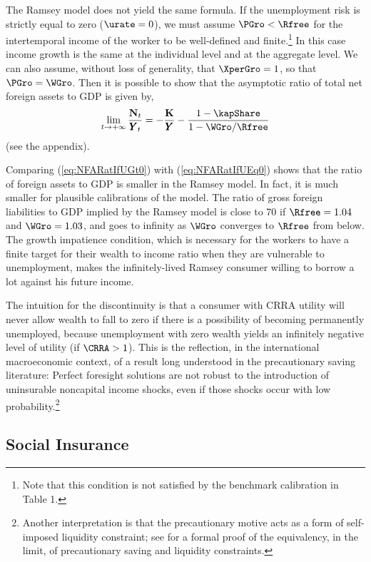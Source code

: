 \documentclass[titlepage]{\econtex}\newcommand{\texname}{cjSOE}
\renewcommand{\GDPLev}{\ensuremath{\pmb{Y}}}
\begin{document}
The Ramsey model does not yield the same formula. If the unemployment risk is strictly equal to zero ($\urate=0$), we must assume $\PGro < \Rfree$ for the intertemporal income of the worker to be well-defined and finite.\footnote{Note that this condition is not satisfied by the benchmark calibration in Table 1.} In this case income growth is the same at the individual level and at the aggregate level. We can also assume, without loss of generality, that $\XperGro=1$, so that $\PGro=\WGro$. Then it is possible to show that the asymptotic ratio of total net foreign assets to GDP is given by,
\begin{equation}
\lim_{t \rightarrow +\infty} \frac{\NFALev_t}{\GDPLev_t}=-\frac{\KLev}{\GDPLev}-\frac{1-\kapShare}{1-\WGro/\Rfree}
\label{eq:NFARatIfUEq0}
\end{equation}
(see the appendix).

Comparing (\ref{eq:NFARatIfUGt0}) with (\ref{eq:NFARatIfUEq0}) shows that the ratio of foreign assets to GDP is smaller in the Ramsey model. In fact, it is much smaller for plausible calibrations of the model. The ratio of gross foreign liabilities to GDP implied by the Ramsey model is close to 70 if $\Rfree =1.04$ and $\WGro =1.03$, and goes to infinity as $\WGro$ converges to $\Rfree$ from below. The growth impatience condition, which is necessary for the workers to have a finite target for their wealth to income ratio when they are vulnerable to unemployment, makes the infinitely-lived Ramsey consumer willing to borrow a lot against his future income.

The intuition for the discontinuity is that a consumer with CRRA
utility will never allow wealth to fall to zero if there is a
possibility of becoming permanently unemployed, because unemployment
with zero wealth yields an infinitely negative level of utility (if
$\CRRA>1$).  This is the reflection, in the international
macroeconomic context, of a result long understood in the
precautionary saving literature: Perfect foresight solutions are not
robust to the introduction of uninsurable noncapital income
shocks, even if those shocks occur with low probability.\footnote{Another interpretation is that the precautionary motive acts as a form of self-imposed liquidity constraint; see \cite{BufferStockTheory} for a formal proof of the equivalency, in the limit, of precautionary saving and liquidity constraints.}

\subsection{Social Insurance}
\end{document}
